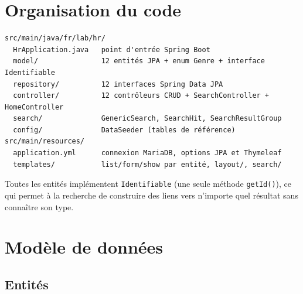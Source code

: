 \documentclass[a4paper,11pt]{article}
\newcommand{\code}[1]{\texttt{#1}}
\begin{document}
\section{Organisation du code}

\begin{lstlisting}
src/main/java/fr/lab/hr/
  HrApplication.java   point d'entrée Spring Boot
  model/               12 entités JPA + enum Genre + interface Identifiable
  repository/          12 interfaces Spring Data JPA
  controller/          12 contrôleurs CRUD + SearchController + HomeController
  search/              GenericSearch, SearchHit, SearchResultGroup
  config/              DataSeeder (tables de référence)
src/main/resources/
  application.yml      connexion MariaDB, options JPA et Thymeleaf
  templates/           list/form/show par entité, layout/, search/
\end{lstlisting}

Toutes les entités implémentent \code{Identifiable} (une seule méthode
\code{getId()}), ce qui permet à la recherche de construire des liens vers
n'importe quel résultat sans connaître son type.

\section{Modèle de données}

\subsection{Entités}
\end{document}
